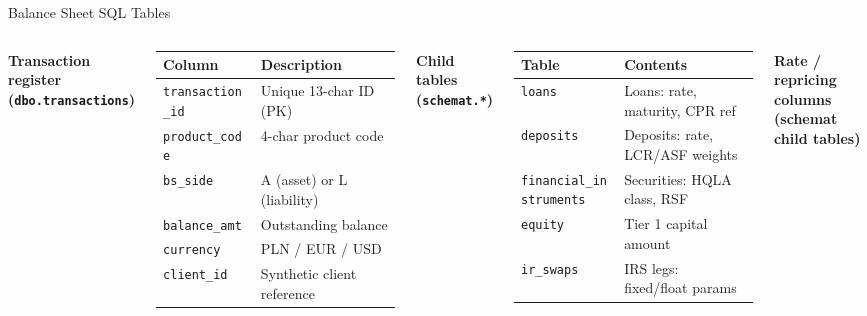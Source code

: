 \documentclass[aspectratio=169,10pt]{beamer}
\begin{document}
\begin{frame}{Balance Sheet SQL Tables}

  \begin{columns}[T]
      \textbf{Transaction register (\texttt{dbo.transactions})}

      \vspace{2pt}
      \small
      \begin{tabular}{ll}
        \toprule
        Column & Description \\
        \midrule
        \texttt{transaction\_id} & Unique 13-char ID (PK) \\
        \texttt{product\_code}   & 4-char product code \\
        \texttt{bs\_side}        & A (asset) or L (liability) \\
        \texttt{balance\_amt}    & Outstanding balance \\
        \texttt{currency}        & PLN / EUR / USD \\
        \texttt{client\_id}      & Synthetic client reference \\
        \bottomrule
      \end{tabular}

      \vspace{6pt}
      \textbf{Child tables (\texttt{schemat.*})}

      \small
      \begin{tabular}{ll}
        \toprule
        Table & Contents \\
        \midrule
        \texttt{loans}               & Loans: rate, maturity, CPR ref \\
        \texttt{deposits}            & Deposits: rate, LCR/ASF weights \\
        \texttt{financial\_instruments} & Securities: HQLA class, RSF \\
        \texttt{equity}              & Tier 1 capital amount \\
        \texttt{ir\_swaps}           & IRS legs: fixed/float params \\
        \bottomrule
      \end{tabular}

      \textbf{Rate / repricing columns (schemat child tables)}


\end{columns}
\end{frame}
\end{document}
